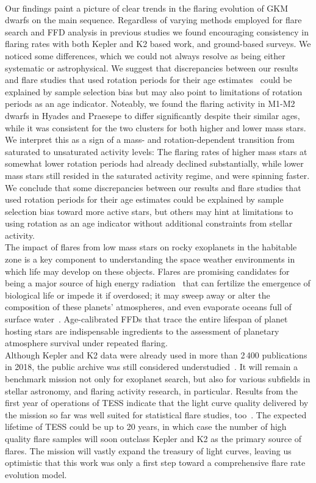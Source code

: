 \documentclass{aa}
\begin{document}
\\
Our findings paint a picture of clear trends in the flaring evolution of GKM dwarfs on the main sequence. Regardless of varying methods employed for flare search and FFD analysis in previous studies we found encouraging consistency in flaring rates with both Kepler and K2 based work, and ground-based surveys. We noticed some differences, which we could not always resolve as being either systematic or astrophysical. We suggest that discrepancies between our results and flare studies that used rotation periods for their age estimates~\citep{davenport2019, raetz2020} could be explained by sample selection bias but may also point to limitations of rotation periods as an age indicator. Noteably, we found the flaring activity in M1-M2 dwarfs in Hyades and Praesepe to differ significantly despite their similar ages, while it was consistent for the two clusters for both higher and lower mass stars. We interpret this as a sign of a mass- and rotation-dependent transition from saturated to unsaturated activity levels: The flaring rates of higher mass stars at somewhat lower rotation periods had already declined substantially, while lower mass stars still resided in the saturated activity regime, and were spinning faster. We conclude that some discrepancies between our results and flare studies that used rotation periods for their age estimates could be explained by sample selection bias toward more active stars, but others may hint at limitations to using rotation as an age indicator without additional constraints from stellar activity. 
\\
The impact of flares from low mass stars on rocky exoplanets in the habitable zone is a key component to understanding the space weather environments in which life may develop on these objects. Flares are promising candidates for being a major source of high energy radiation~\citep{airapetian2020} that can fertilize the emergence of biological life or impede it if overdosed; it may sweep away or alter the composition of these planets' atmospheres, and even evaporate oceans full of surface water~\citep{shields2016, tilley2019}. Age-calibrated FFDs that trace the entire lifespan of planet hosting stars are indispensable ingredients to the assessment of planetary atmosphere survival under repeated flaring. 
\\
Although Kepler and K2 data were already used in more than 2\,400 publications in 2018, the public archive was still considered understudied~\citep{barentsen_retirement_opportunities_2018}. It will remain a benchmark mission not only for exoplanet search, but also for various subfields in stellar astronomy, and flaring activity research, in particular. Results from the first year of operations of TESS indicate that the light curve quality delivered by the mission so far was well suited for statistical flare studies, too~\citep{doyle2020,guenther2020, feinstein2020}. The expected lifetime of TESS could be up to 20 years, in which case the number of high quality flare samples will soon outclass Kepler and K2 as the primary source of flares. The mission will vastly expand the treasury of light curves, leaving us optimistic that this work was only a first step toward a comprehensive flare rate evolution model. 
\end{document}
